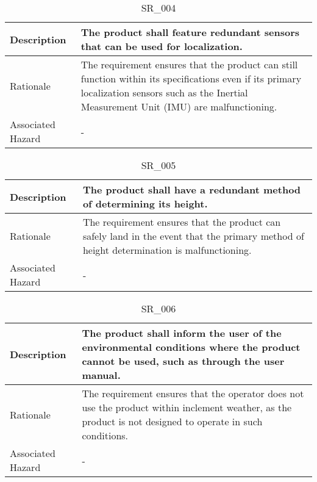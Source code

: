 \documentclass{article}
\begin{document}
\begin{table}[!h]
\begin{center}
\caption {SR\_004} 
\label{SR_004}
\begin{tabular}{ | m{3cm} | m{11cm} | }
\hline
Description & The product shall feature redundant sensors that can be used for localization.
 \\
\hline
Rationale & The requirement ensures that the product can still function within its specifications even if its primary localization sensors such as the Inertial Measurement Unit (IMU) are malfunctioning. \\
\hline
Associated Hazard & - \\
\hline
\end{tabular}
\end{center}
\end{table}

\begin{table}[!h]
\begin{center}
\caption {SR\_005} 
\label{SR_005}
\begin{tabular}{ | m{3cm} | m{11cm} | }
\hline
Description & The product shall have a redundant method of determining its height.
 \\
\hline
Rationale & The requirement ensures that the product can safely land in the event that the primary method of height determination is malfunctioning. \\
\hline
Associated Hazard & - \\
\hline
\end{tabular}
\end{center}
\end{table}

\begin{table}[!h]
\begin{center}
\caption {SR\_006} 
\label{SR_006}
\begin{tabular}{ | m{3cm} | m{11cm} | }
\hline
Description & The product shall inform the user of the environmental conditions where the product cannot be used, such as through the user manual. \\
\hline
Rationale & The requirement ensures that the operator does not use the product within inclement weather, as the product is not designed to operate in such conditions. \\
\hline
Associated Hazard & - \\
\hline
\end{tabular}
\end{center}
\end{table}
\end{document}
